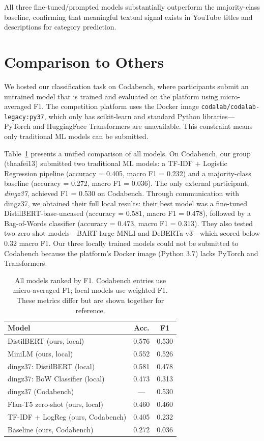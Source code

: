 \documentclass[11pt]{article}
\begin{document}
All three fine-tuned/prompted models substantially outperform the majority-class baseline, confirming that meaningful textual signal exists in YouTube titles and descriptions for category prediction.

\section{Comparison to Others}

We hosted our classification task on Codabench, where participants submit an untrained model that is trained and evaluated on the platform using micro-averaged F1. The competition platform uses the Docker image \texttt{codalab/codalab-legacy:py37}, which only has scikit-learn and standard Python libraries---PyTorch and HuggingFace Transformers are unavailable. This constraint means only traditional ML models can be submitted.

Table~\ref{tab:codabench} presents a unified comparison of all models. On Codabench, our group (thaafei13) submitted two traditional ML models: a TF-IDF + Logistic Regression pipeline (accuracy = 0.405, macro F1 = 0.232) and a majority-class baseline (accuracy = 0.272, macro F1 = 0.036). The only external participant, \textit{dingz37}, achieved F1 = 0.530 on Codabench. Through communication with dingz37, we obtained their full local results: their best model was a fine-tuned DistilBERT-base-uncased (accuracy = 0.581, macro F1 = 0.478), followed by a Bag-of-Words classifier (accuracy = 0.473, macro F1 = 0.313). They also tested two zero-shot models---BART-large-MNLI and DeBERTa-v3---which scored below 0.32 macro F1. Our three locally trained models could not be submitted to Codabench because the platform's Docker image (Python 3.7) lacks PyTorch and Transformers.

\begin{table}[t]
\centering
\small
\begin{tabular}{@{}lcc@{}}
\toprule
\textbf{Model} & \textbf{Acc.} & \textbf{F1} \\
\midrule
DistilBERT (ours, local) & 0.576 & 0.530 \\
MiniLM (ours, local) & 0.552 & 0.526 \\
dingz37: DistilBERT (local) & 0.581 & 0.478 \\
dingz37: BoW Classifier (local) & 0.473 & 0.313 \\
dingz37 (Codabench) & --- & 0.530 \\
Flan-T5 zero-shot (ours, local) & 0.460 & 0.460 \\
TF-IDF + LogReg (ours, Codabench) & 0.405 & 0.232 \\
Baseline (ours, Codabench) & 0.272 & 0.036 \\
\bottomrule
\end{tabular}
\caption{All models ranked by F1. Codabench entries use micro-averaged F1; local models use weighted F1. These metrics differ but are shown together for reference.}
\label{tab:codabench}
\end{table}
\end{document}

